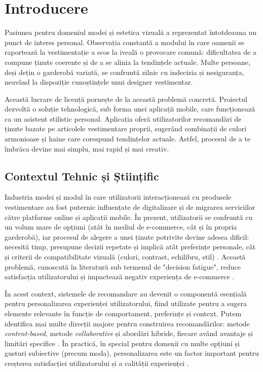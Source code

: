 \chapter{Introducere}
\label{cap:introducere}

Pasiunea pentru domeniul modei și estetica vizuală a reprezentat întotdeauna un punct de interes personal. Observația constantă a modului în care oamenii se raportează la vestimentație a scos la iveală o provocare comună: dificultatea de a compune ținute coerente și de a se alinia la tendințele actuale. Multe persoane, deși dețin o garderobă variată, se confruntă zilnic cu indecizia și nesiguranța, neavând la dispoziție cunoștințele unui designer vestimentar.

Această lucrare de licență pornește de la această problemă concretă. Proiectul dezvoltă o soluție tehnologică, sub forma unei aplicații mobile, care funcționează ca un asistent stilistic personal. Aplicația oferă utilizatorilor recomandări de ținute bazate pe articolele vestimentare proprii, sugerând combinații de culori armonioase și haine care corespund tendințelor actuale. Astfel, procesul de a te îmbrăca devine mai simplu, mai rapid și mai creativ.

\section{Contextul Tehnic și Științific}

Industria modei și modul în care utilizatorii interacționează cu produsele vestimentare au fost puternic influențate de digitalizare și de migrarea serviciilor către platforme online și aplicații mobile. În prezent, utilizatorii se confruntă cu un volum mare de opțiuni (atât în mediul de e-commerce, cât și în propria garderobă), iar procesul de alegere a unei ținute potrivite devine adesea dificil: necesită timp, presupune decizii repetate și implică atât preferințe personale, cât și criterii de compatibilitate vizuală (culori, contrast, echilibru, stil) \cite{kang2017visually}. Această problemă, cunoscută în literatură sub termenul de "decision fatigue", reduce satisfacția utilizatorului și impactează negativ experiența de e-commerce \cite{fashion_ai_review}.

În acest context, sistemele de recomandare au devenit o componentă esențială pentru personalizarea experienței utilizatorului, fiind utilizate pentru a sugera elemente relevante în funcție de comportament, preferințe și context. Putem identifica mai multe direcții majore pentru construirea recomandărilor: metode \textit{content-based}, metode \textit{collaborative} și abordări hibride, fiecare având avantaje și limitări specifice \cite{adomavicius2005toward}. În practică, în special pentru domenii cu multe opțiuni și gusturi subiective (precum moda), personalizarea este un factor important pentru creșterea satisfacției utilizatorului și a calității experienței \cite{su2009survey}.

